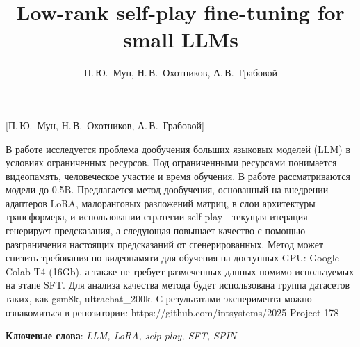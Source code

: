 \documentclass[12pt, twoside]{article}
\begin{document}
\title
    [] %
    {Low-rank self-play fine-tuning for small LLMs}
\author
    [] %
    {П.\,Ю.~Мун, Н.\,В.~Охотников, А.\,В.~Грабовой} %
    [П.\,Ю.~Мун, Н.\,В.~Охотников, А.\,В.~Грабовой] %

\abstract
  {В работе исследуется проблема дообучения больших языковых моделей (LLM) в условиях ограниченных ресурсов. Под ограниченными ресурсами понимается видеопамять, человеческое участие и время обучения. В работе рассматриваются модели до 0.5B. Предлагается метод дообучения, основанный на внедрении адаптеров LoRA, малоранговых разложений матриц, в слои архитектуры трансформера, и использовании стратегии self-play - текущая итерация генерирует предсказания, а следующая повышает качество с помощью разграничения настоящих предсказаний от сгенерированных. Метод может снизить требования по видеопамяти для обучения на доступных GPU: Google Colab T4 (16Gb), а также не требует размеченных данных помимо используемых на этапе SFT. Для анализа качества метода будет использована группа датасетов таких, как gsm8k, ultrachat\_200k. С результатами эксперимента можно ознакомиться в репозитории: https://github.com/intsystems/2025-Project-178


\bigskip
\noindent
\textbf{Ключевые слова}: \emph {LLM, LoRA, selp-play, SFT, SPIN}
}
\doi{}
\receivedRus{}
\receivedEng{}

\maketitle
\linenumbers
\end{document}
